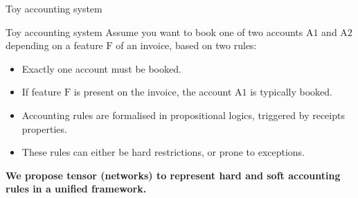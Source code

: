 \documentclass{beamer}
\begin{document}
    \begin{frame}{Toy accounting system}
        \begin{block}{Toy accounting system}
            Assume you want to book one of two accounts $\mathrm{A1}$ and $\mathrm{A2}$ depending on a feature $\mathrm{F}$ of an invoice, based on two rules:
            \begin{itemize}
                \item \textcolor{\concolor}{Exactly one account must be booked.}
                \item \textcolor{\probcolor}{If feature $\mathrm{F}$ is present on the invoice, the account $\mathrm{A1}$ is typically booked.}
            \end{itemize}
        \end{block}

        \begin{itemize}
            \item {Accounting rules} are formalised in propositional logics, triggered by receipts properties.
            \item These rules can either be \textcolor{\concolor}{hard restrictions}, or \textcolor{\probcolor}{prone to exceptions}.
        \end{itemize}

        \begin{center}
            \bf We propose tensor (networks) to represent hard and soft accounting rules in a unified framework.
        \end{center}

    \end{frame}
\end{document}
